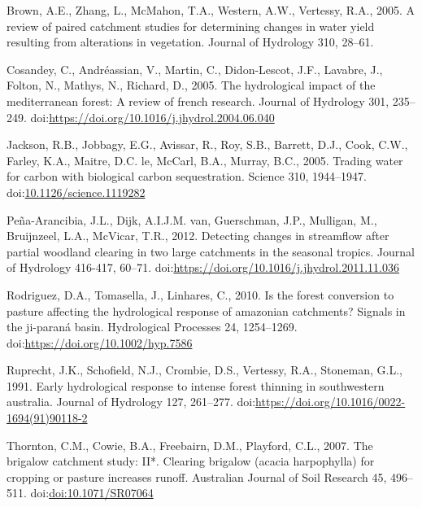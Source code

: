 \documentclass[]{elsarticle} %
\begin{document}
\leavevmode\hypertarget{ref-brown2005}{}%
Brown, A.E., Zhang, L., McMahon, T.A., Western, A.W., Vertessy, R.A.,
2005. A review of paired catchment studies for determining changes in
water yield resulting from alterations in vegetation. Journal of
Hydrology 310, 28--61.

\leavevmode\hypertarget{ref-cosandey2005}{}%
Cosandey, C., Andréassian, V., Martin, C., Didon-Lescot, J.F., Lavabre,
J., Folton, N., Mathys, N., Richard, D., 2005. The hydrological impact
of the mediterranean forest: A review of french research. Journal of
Hydrology 301, 235--249.
doi:\href{https://doi.org/https://doi.org/10.1016/j.jhydrol.2004.06.040}{https://doi.org/10.1016/j.jhydrol.2004.06.040}

\leavevmode\hypertarget{ref-jackson2005}{}%
Jackson, R.B., Jobbagy, E.G., Avissar, R., Roy, S.B., Barrett, D.J.,
Cook, C.W., Farley, K.A., Maitre, D.C. le, McCarl, B.A., Murray, B.C.,
2005. Trading water for carbon with biological carbon sequestration.
Science 310, 1944--1947.
doi:\href{https://doi.org/10.1126/science.1119282}{10.1126/science.1119282}

\leavevmode\hypertarget{ref-pena-arancibia2012}{}%
Peña-Arancibia, J.L., Dijk, A.I.J.M. van, Guerschman, J.P., Mulligan,
M., Bruijnzeel, L.A., McVicar, T.R., 2012. Detecting changes in
streamflow after partial woodland clearing in two large catchments in
the seasonal tropics. Journal of Hydrology 416-417, 60--71.
doi:\href{https://doi.org/https://doi.org/10.1016/j.jhydrol.2011.11.036}{https://doi.org/10.1016/j.jhydrol.2011.11.036}

\leavevmode\hypertarget{ref-rodriguez2010}{}%
Rodriguez, D.A., Tomasella, J., Linhares, C., 2010. Is the forest
conversion to pasture affecting the hydrological response of amazonian
catchments? Signals in the ji-paraná basin. Hydrological Processes 24,
1254--1269.
doi:\href{https://doi.org/https://doi.org/10.1002/hyp.7586}{https://doi.org/10.1002/hyp.7586}

\leavevmode\hypertarget{ref-ruprechtetal1991}{}%
Ruprecht, J.K., Schofield, N.J., Crombie, D.S., Vertessy, R.A.,
Stoneman, G.L., 1991. Early hydrological response to intense forest
thinning in southwestern australia. Journal of Hydrology 127, 261--277.
doi:\href{https://doi.org/https://doi.org/10.1016/0022-1694(91)90118-2}{https://doi.org/10.1016/0022-1694(91)90118-2}

\leavevmode\hypertarget{ref-thornton2007}{}%
Thornton, C.M., Cowie, B.A., Freebairn, D.M., Playford, C.L., 2007. The
brigalow catchment study: II*. Clearing brigalow (acacia harpophylla)
for cropping or pasture increases runoff. Australian Journal of Soil
Research 45, 496--511.
doi:\href{https://doi.org/doi:10.1071/SR07064}{doi:10.1071/SR07064}
\end{document}
